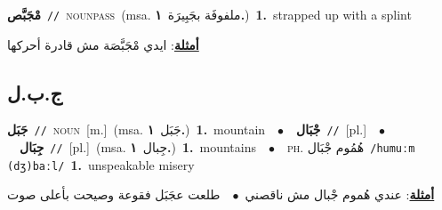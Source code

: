 \documentclass[10pt,a4paper,twoside]{article} %
\begin{document}
\begin{multicols}{2}
{\setlength\topsep{0pt}\textbf{\foreignlanguage{arabic}{مْجَبَّص}}\ {\color{gray}\texttt{//}\color{black}}\ \textsc{noun\textunderscore pass}\ \color{gray}(msa. \foreignlanguage{arabic}{ملفوفَة بجَبِيرَة}~\foreignlanguage{arabic}{\textbf{١.}})\color{black}\ \textbf{1.}~strapped up with a splint\  \begin{flushright}\color{gray}\foreignlanguage{arabic}{\textbf{\underline{\foreignlanguage{arabic}{أمثلة}}}: ايدي مْجَبَّصَة مش قادرة أحركها}\end{flushright}\color{black}} \vspace{2mm}

\vspace{-3mm}
\subsection*{\color{blue}\foreignlanguage{arabic}{ج.ب.ل}\color{blue}{}} 

{\setlength\topsep{0pt}\textbf{\foreignlanguage{arabic}{جَبَل}}\ {\color{gray}\texttt{//}\color{black}}\ \textsc{noun}\ [m.]\ \color{gray}(msa. \foreignlanguage{arabic}{جَبَل}~\foreignlanguage{arabic}{\textbf{١.}})\color{black}\ \textbf{1.}~mountain\ \ $\bullet$\ \ \setlength\topsep{0pt}\textbf{\foreignlanguage{arabic}{جْبَال}}\ {\color{gray}\texttt{//}\color{black}}\ [pl.]\ \ $\bullet$\ \ \setlength\topsep{0pt}\textbf{\foreignlanguage{arabic}{جِبَال}}\ {\color{gray}\texttt{//}\color{black}}\ [pl.]\ \color{gray}(msa. \foreignlanguage{arabic}{جِبال}~\foreignlanguage{arabic}{\textbf{١.}})\color{black}\ \textbf{1.}~mountains\ \ $\bullet$\ \ \textsc{ph.} \color{gray} \foreignlanguage{arabic}{هُمُوم جْبَال}\color{black}\ {\color{gray}\texttt{/{\sffamily humuːm (dʒ)baːl}/}\color{black}}\ \textbf{1.}~unspeakable misery\  \begin{flushright}\color{gray}\foreignlanguage{arabic}{\textbf{\underline{\foreignlanguage{arabic}{أمثلة}}}: عندي هُموم جْبال مش ناقصني\ $\bullet$\ \  طلعت عجَبَل فقوعة وصيحت بأعلى صوت}\end{flushright}\color{black}} \vspace{2mm}


\end{multicols}
\end{document}
